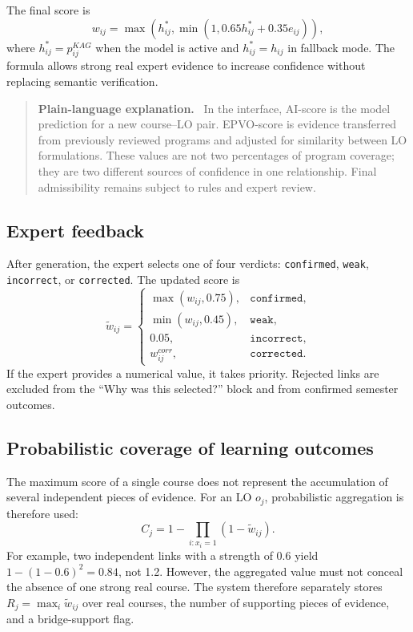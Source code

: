 \documentclass[twoside,11pt]{article}
\newenvironment{plainbox}{\begin{quote}\small\noindent\textbf{Plain-language explanation.}\ }{\end{quote}}
\begin{document}
The final score is
\begin{equation}
  w_{ij}=
  \max\left(
    h_{ij}^{\ast},
    \min(1,0.65h_{ij}^{\ast}+0.35e_{ij})
  \right),
  \label{eq:expert-blend}
\end{equation}
where $h_{ij}^{\ast}=p_{ij}^{KAG}$ when the model is active and $h_{ij}^{\ast}=h_{ij}$ in fallback mode. The formula allows strong real expert evidence to increase confidence without replacing semantic verification.

\begin{plainbox}
In the interface, AI-score is the model prediction for a new course--LO pair. EPVO-score is evidence transferred from previously reviewed programs and adjusted for similarity between LO formulations. These values are not two percentages of program coverage; they are two different sources of confidence in one relationship. Final admissibility remains subject to rules and expert review.
\end{plainbox}

\subsection{Expert feedback}

After generation, the expert selects one of four verdicts: \texttt{confirmed}, \texttt{weak}, \texttt{incorrect}, or \texttt{corrected}. The updated score is
\begin{equation}
\tilde w_{ij}=
\begin{cases}
\max(w_{ij},0.75), & \texttt{confirmed},\\
\min(w_{ij},0.45), & \texttt{weak},\\
0.05, & \texttt{incorrect},\\
w_{ij}^{corr}, & \texttt{corrected}.
\end{cases}
\label{eq:feedback}
\end{equation}
If the expert provides a numerical value, it takes priority. Rejected links are excluded from the ``Why was this selected?'' block and from confirmed semester outcomes.

\subsection{Probabilistic coverage of learning outcomes}

The maximum score of a single course does not represent the accumulation of several independent pieces of evidence. For an LO $o_j$, probabilistic aggregation is therefore used:
\begin{equation}
  C_j=1-\prod_{i:x_i=1}(1-\tilde w_{ij}).
  \label{eq:prob-coverage}
\end{equation}
For example, two independent links with a strength of 0.6 yield $1-(1-0.6)^2=0.84$, not 1.2. However, the aggregated value must not conceal the absence of one strong real course. The system therefore separately stores $R_j=\max_i \tilde w_{ij}$ over real courses, the number of supporting pieces of evidence, and a bridge-support flag.
\end{document}
